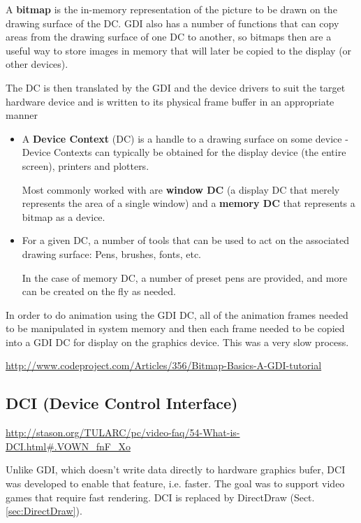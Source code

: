 A {\bf bitmap} is the in-memory representation of the picture to be drawn on the
drawing surface of the DC. GDI also has a number of functions that can copy
areas from the drawing surface of one DC to another, so bitmaps then are a
useful way to store images in memory that will later be copied to the display
(or other devices).

The DC is then translated by the GDI and the device drivers to suit the target
hardware device and is written to its physical frame buffer in an appropriate
manner
\begin{itemize}
  
  \item A {\bf Device Context} (DC) is a handle to a drawing surface on some
  device - Device Contexts can typically be obtained for the display device (the
  entire screen), printers and plotters.
  
Most commonly worked with are {\bf window DC} (a display DC that merely
represents the area of a single window) and a {\bf memory DC} that represents a
bitmap as a device.

  \item For a given DC, a number of tools that can be used to act on the
  associated drawing surface: Pens, brushes, fonts, etc.
  
In the case of memory DC, a number of preset pens are provided, and more can be
created on the fly as needed.
\end{itemize}

In order to do animation using the GDI DC, all of the animation frames needed to
be manipulated in system memory and then each frame needed to be copied into a
GDI DC for display on the graphics device. This was a very slow process.

\url{http://www.codeproject.com/Articles/356/Bitmap-Basics-A-GDI-tutorial}

\subsection{DCI (Device Control Interface)}
\label{sec:DCI}

\url{http://stason.org/TULARC/pc/video-faq/54-What-is-DCI.html#.VOWN_fnF_Xo}

Unlike GDI, which doesn't write data directly to hardware graphics bufer, DCI
was developed to enable that feature, i.e. faster. The goal was to support
video games that require fast rendering.
DCI is replaced by DirectDraw (Sect.\ref{sec:DirectDraw}).


